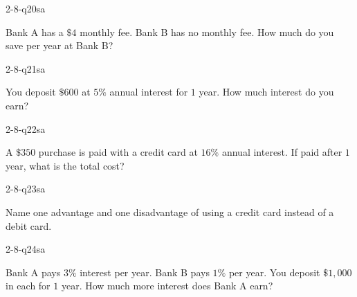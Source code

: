 \begin{practiceQuestion}{2-8-q20}{sa}
\begin{questionText}
Bank A has a $\$4$ monthly fee. Bank B has no monthly fee. How much do you save per year at Bank B?
\end{questionText}
\end{practiceQuestion}

\begin{practiceQuestion}{2-8-q21}{sa}
\begin{questionText}
You deposit $\$600$ at $5\%$ annual interest for $1$ year. How much interest do you earn?
\end{questionText}
\end{practiceQuestion}

\begin{practiceQuestion}{2-8-q22}{sa}
\begin{questionText}
A $\$350$ purchase is paid with a credit card at $16\%$ annual interest. If paid after $1$ year, what is the total cost?
\end{questionText}
\end{practiceQuestion}

\begin{practiceQuestion}{2-8-q23}{sa}
\begin{questionText}
Name one advantage and one disadvantage of using a credit card instead of a debit card.
\end{questionText}
\end{practiceQuestion}

\begin{practiceQuestion}{2-8-q24}{sa}
\begin{questionText}
Bank A pays $3\%$ interest per year. Bank B pays $1\%$ per year. You deposit $\$1{,}000$ in each for $1$ year. How much more interest does Bank A earn?
\end{questionText}
\end{practiceQuestion}

